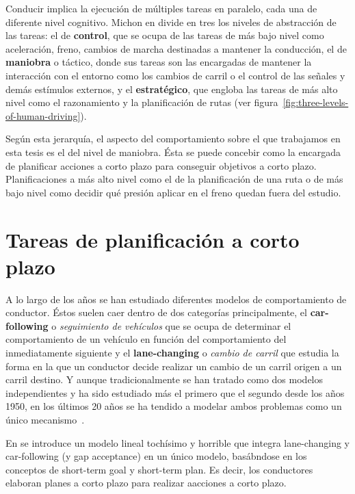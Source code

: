 Conducir implica la ejecución de múltiples tareas en paralelo, cada una de diferente nivel cognitivo. Michon en \cite{michon1985critical} divide en tres los niveles de abstracción de las tareas: el de \textbf{control}, que se ocupa de las tareas de más bajo nivel como aceleración, freno, cambios de marcha destinadas a mantener la conducción, el de \textbf{maniobra} o táctico, donde sus tareas son las encargadas de mantener la interacción con el entorno como los cambios de carril o el control de las señales y demás estímulos externos, y el \textbf{estratégico}, que engloba las tareas de más alto nivel como el razonamiento y la planificación de rutas (ver figura~\ref{fig:three-levels-of-human-driving}).

Según esta jerarquía, el aspecto del comportamiento sobre el que trabajamos en esta tesis es el del nivel de maniobra. Ésta se puede concebir como la encargada de planificar acciones a corto plazo para conseguir objetivos a corto plazo. Planificaciones a más alto nivel como el de la planificación de una ruta o de más bajo nivel como decidir qué presión aplicar en el freno quedan fuera del estudio.

\section{Tareas de planificación a corto plazo}

A lo largo de los años se han estudiado diferentes modelos de comportamiento de conductor. Éstos suelen caer dentro de dos categorías principalmente, el \textbf{car-following} o \textit{seguimiento de vehículos} que se ocupa de determinar el comportamiento de un vehículo en función del comportamiento del inmediatamente siguiente y el \textbf{lane-changing} o \textit{cambio de carril} que estudia la forma en la que un conductor decide realizar un cambio de un carril origen a un carril destino. Y aunque tradicionalmente se han tratado como dos modelos independientes y ha sido estudiado más el primero que el segundo desde los años 1950, en los últimos 20 años se ha tendido a modelar ambos problemas como un único mecanismo~\cite{Ma2004}.



En \cite{Toledo2007} se introduce un modelo lineal tochísimo y horrible que integra lane-changing y car-following (y gap acceptance) en un único modelo, basábndose en los conceptos de short-term goal y short-term plan. Es decir, los conductores elaboran planes a corto plazo para realizar aacciones a corto plazo.

